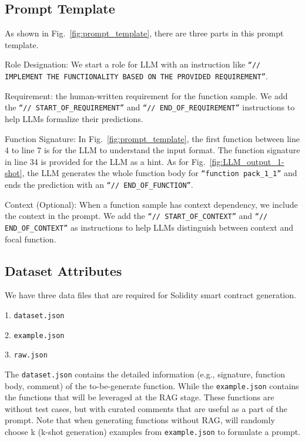 \subsection{Prompt Template}

As shown in Fig.~\ref{fig:prompt_template}, there are three parts in this prompt template.


 Role Designation: 
We start a role for LLM with an instruction like \texttt{``// IMPLEMENT THE FUNCTIONALITY BASED ON THE PROVIDED REQUIREMENT''}.


 Requirement: the human-written requirement for the function sample. 
We add the \texttt{``// START\_OF\_REQUIREMENT''} and \texttt{``// END\_OF\_REQUIREMENT''} instructions to help LLMs formalize their predictions.


 Function Signature: In Fig.~\ref{fig:prompt_template}, the first function between line 4 to line 7 is for the LLM to understand the input format. 
The function signature in line 34 is provided for the LLM as a hint. 
As for Fig.~\ref{fig:LLM_output_1-shot}, the LLM generates the whole function body for \texttt{``function pack\_1\_1''} and ends the prediction with an \texttt{``// END\_OF\_FUNCTION''}.


 Context (Optional): When a function sample has context dependency, we include the context in the prompt.
We add the \texttt{``// START\_OF\_CONTEXT''} and \texttt{``// END\_OF\_CONTEXT''} as instructions to help LLMs distinguish between context and focal function.


\subsection{Dataset Attributes}
\label{RAG attributes}
We have three data files that are required for Solidity smart contract generation.

1. \texttt{dataset.json}

2. \texttt{example.json}

3. \texttt{raw.json}

The \texttt{dataset.json} contains the detailed information (e.g., signature, function body, comment) of the to-be-generate function. 
While the \texttt{example.json} contains the functions that will be leveraged at the RAG stage. 
These functions are without test cases, but with curated comments that are useful as a part of the prompt. 
Note that when generating functions without RAG, \datasetname will randomly choose k (k-shot generation) examples from \texttt{example.json} to formulate a prompt.


